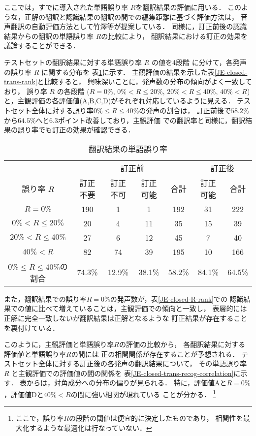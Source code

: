 ここでは，すでに導入された単語誤り率 $R$を翻訳結果の評価に用いる．
このような，正解の翻訳と認識結果の翻訳の間での編集距離に基づく評価方法は，
音声翻訳の自動評価方法として竹澤等\cite{Takezawa1999}が提案している．
同様に，訂正前後の認識結果からの翻訳の単語誤り率 $R$の比較により，
翻訳結果における訂正の効果を議論することができる．

テストセットの翻訳結果に対する単語誤り率 $R$ の値を4段階
に分けて，各発声の誤り率 $R$ に関する分布を
表\ref{JE-closed-trans-dp}に示す．
主観評価の結果を示した表\ref{JE-closed-trans-rank}と比較すると，
興味深いことに，発声数の分布の傾向がよく一致しており，
誤り率 $R$ の各段階
($R = 0\%$, $0\% < R \leq 20\%$, $20\% < R \leq 40\%$, $40\% < R$)
と，主観評価の各評価値(A,B,C,D)がそれぞれ対応しているように見える．
テストセット全体に対する誤り率$0\% \leq R \leq 40\%$の発声の割合は，
訂正前後で$58.2\%$から$64.5\%$へと$6.3$ポイント改善しており，主観評価
での翻訳率と同様に，翻訳結果の誤り率でも訂正の効果が確認できる．

\begin{table}
\begin{center}
\caption{翻訳結果の単語誤り率}
\label{JE-closed-trans-dp}
\begin{tabular}{|c||c|c|c||c||c||c|} \hline
 & \multicolumn{4}{c||}{訂正前} & \multicolumn{2}{c|}{訂正後}\\ \cline{2-7}
誤り率 $R$ & 訂正不要  & 訂正不可 & 訂正可能 & 合計 & 訂正可能 & 合計 \\ \hline\hline
$R = 0\%$ & 190 & 1 & 1 & 192 & 31 & 222 \\ \hline
$0\% < R \leq 20\%$ & 20 & 4 & 11 & 35 & 15 & 39 \\ \hline
$20\% < R \leq 40\%$ & 27 & 6 & 12 & 45 & 7 & 40 \\ \hline
$40\% < R$ & 82 & 74 & 39 & 195 & 10 & 166 \\ \hline\hline
$0\% \leq R \leq 40\%$の割合 & 74.3\% & 12.9\% & 38.1\% & 58.2\% & 84.1\% & 64.5\% \\ \hline
\end{tabular}
\end{center}
\end{table}

また，翻訳結果での誤り率$R=0\%$の発声数が，表\ref{JE-closed-R-rank}での
認識結果での値に比べて増えていることは，主観評価での傾向と一致し，
表層的には正解に完全一致しないが翻訳結果は正解となるような
訂正結果が存在することを裏付けている．

このように，主観評価と単語誤り率$R$の評価の比較から，
各翻訳結果に対する評価値と単語誤り率$R$の間には
正の相関関係が存在することが予想される．
テストセット全体に対する訂正後の各発声の翻訳結果について，
その単語誤り率 $R$ と主観評価での評価値の間の関係を
表\ref{JE-closed-trans-recog-correlation}に示す．
表からは，対角成分への分布の偏りが見られる．
特に，評価値Aと$R = 0\%$，評価値Dと$40\% < R$の間に強い相関が現れている
ことが分かる．
\footnote{ここで，誤り率$R$の段階の閾値は便宜的に決定したものであり，
相関性を最大化するような最適化は行なっていない．}

